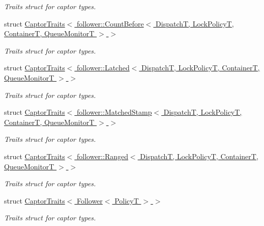 \begin{DoxyCompactItemize}
\begin{DoxyCompactList}\small\item\em Traits struct for captor types. \end{DoxyCompactList}\item 
struct \hyperlink{structflow_1_1_captor_traits_3_01follower_1_1_count_before_3_01_dispatch_t_00_01_lock_policy_t_0d08c28482191f4a9fdac77c50d53921d}{Captor\+Traits$<$ follower\+::\+Count\+Before$<$ Dispatch\+T, Lock\+Policy\+T, Container\+T, Queue\+Monitor\+T $>$ $>$}
\begin{DoxyCompactList}\small\item\em Traits struct for captor types. \end{DoxyCompactList}\item 
struct \hyperlink{structflow_1_1_captor_traits_3_01follower_1_1_latched_3_01_dispatch_t_00_01_lock_policy_t_00_01_7069ffe3c5f41ae454dc415b835f945a}{Captor\+Traits$<$ follower\+::\+Latched$<$ Dispatch\+T, Lock\+Policy\+T, Container\+T, Queue\+Monitor\+T $>$ $>$}
\begin{DoxyCompactList}\small\item\em Traits struct for captor types. \end{DoxyCompactList}\item 
struct \hyperlink{structflow_1_1_captor_traits_3_01follower_1_1_matched_stamp_3_01_dispatch_t_00_01_lock_policy_t_98530359aca39d952e431eb90b81d0f7}{Captor\+Traits$<$ follower\+::\+Matched\+Stamp$<$ Dispatch\+T, Lock\+Policy\+T, Container\+T, Queue\+Monitor\+T $>$ $>$}
\begin{DoxyCompactList}\small\item\em Traits struct for captor types. \end{DoxyCompactList}\item 
struct \hyperlink{structflow_1_1_captor_traits_3_01follower_1_1_ranged_3_01_dispatch_t_00_01_lock_policy_t_00_01_c08104af94995091b5ab7569e730f476c}{Captor\+Traits$<$ follower\+::\+Ranged$<$ Dispatch\+T, Lock\+Policy\+T, Container\+T, Queue\+Monitor\+T $>$ $>$}
\begin{DoxyCompactList}\small\item\em Traits struct for captor types. \end{DoxyCompactList}\item 
struct \hyperlink{structflow_1_1_captor_traits_3_01_follower_3_01_policy_t_01_4_01_4}{Captor\+Traits$<$ Follower$<$ Policy\+T $>$ $>$}
\begin{DoxyCompactList}\small\item\em Traits struct for captor types. \end{DoxyCompactList}\item 

\end{DoxyCompactItemize}
